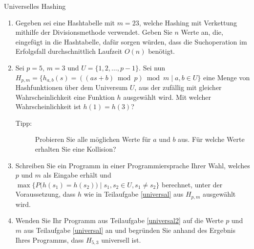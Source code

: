\documentclass[11pt,a4paper]{article}
\begin{document}
\begin{aufgabe}{5}{Universelles Hashing}
    \begin{enumerate}[label=\alph*)]
        \item Gegeben sei eine Hashtabelle mit $m = 23$, welche Hashing mit Verkettung mithilfe der Divisionsmethode verwendet.
        Geben Sie $n$ Werte an, die, eingefügt in die Hashtabelle, dafür sorgen würden, dass die Suchoperation im Erfolgsfall durchschnittlich Laufzeit $O(n)$ benötigt.
        \item \label{universal}
        Sei $p = 5$, $m = 3$ und $U = \{  1, 2, \ldots, p - 1\}$.
        Sei nun $H_{p,m} = \{h_{a,b}(s) = ((as + b) \bmod{p}) \bmod{m} \mid a, b \in U\}$ eine Menge von Hashfunktionen über dem Universum $U$, aus der zufällig mit gleicher Wahrscheinlichkeit eine Funktion $h$ ausgewählt wird.
        Mit welcher Wahrscheinlichkeit ist $h(1) = h(3)$?
        \begin{description}
            \item[Tipp:] Probieren Sie alle möglichen Werte für $a$ und $b$ aus. Für welche Werte erhalten Sie eine Kollision?
        \end{description}
        \item \label{universal2}
        Schreiben Sie ein Programm in einer Programmiersprache Ihrer Wahl, welches $p$ und $m$ als Eingabe erhält und $\max\{P\big(h(s_1) = h(s_2)\big) \mid s_1, s_2 \in U, s_1 \neq s_2\}$ berechnet, unter der Voraussetzung, dass $h$ wie in Teilaufgabe \ref*{universal} aus $H_{p,m}$ ausgewählt wird.
        \item 
        Wenden Sie Ihr Programm aus Teilaufgabe \ref*{universal2} auf die Werte $p$ und $m$ aus Teilaufgabe \ref*{universal} an und begründen Sie anhand des Ergebnis Ihres Programms, dass $H_{5, 3}$ universell ist.  
    \end{enumerate}
\end{aufgabe}
\end{document}

